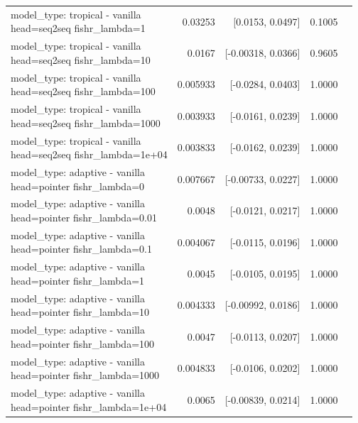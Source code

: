 \documentclass[10pt]{article}
\makeatletter
\newcommand{\stackcell}[1]{\begin{tabular}[t]{@{}l@{}}#1\end{tabular}}
\makeatother
\begin{document}
{\begin{longtable}{lrrrl}
\stackcell{model\_type: tropical - vanilla\\\footnotesize head=seq2seq fishr\_lambda=1 } & 0.03253 & [0.0153, 0.0497] & 0.1005 & \\
\stackcell{model\_type: tropical - vanilla\\\footnotesize head=seq2seq fishr\_lambda=10 } & 0.0167 & [-0.00318, 0.0366] & 0.9605 & \\
\stackcell{model\_type: tropical - vanilla\\\footnotesize head=seq2seq fishr\_lambda=100 } & 0.005933 & [-0.0284, 0.0403] & 1.0000 & \\
\stackcell{model\_type: tropical - vanilla\\\footnotesize head=seq2seq fishr\_lambda=1000 } & 0.003933 & [-0.0161, 0.0239] & 1.0000 & \\
\stackcell{model\_type: tropical - vanilla\\\footnotesize head=seq2seq fishr\_lambda=1e+04 } & 0.003833 & [-0.0162, 0.0239] & 1.0000 & \\
\stackcell{model\_type: adaptive - vanilla\\\footnotesize head=pointer fishr\_lambda=0 } & 0.007667 & [-0.00733, 0.0227] & 1.0000 & \\
\stackcell{model\_type: adaptive - vanilla\\\footnotesize head=pointer fishr\_lambda=0.01 } & 0.0048 & [-0.0121, 0.0217] & 1.0000 & \\
\stackcell{model\_type: adaptive - vanilla\\\footnotesize head=pointer fishr\_lambda=0.1 } & 0.004067 & [-0.0115, 0.0196] & 1.0000 & \\
\stackcell{model\_type: adaptive - vanilla\\\footnotesize head=pointer fishr\_lambda=1 } & 0.0045 & [-0.0105, 0.0195] & 1.0000 & \\
\stackcell{model\_type: adaptive - vanilla\\\footnotesize head=pointer fishr\_lambda=10 } & 0.004333 & [-0.00992, 0.0186] & 1.0000 & \\
\stackcell{model\_type: adaptive - vanilla\\\footnotesize head=pointer fishr\_lambda=100 } & 0.0047 & [-0.0113, 0.0207] & 1.0000 & \\
\stackcell{model\_type: adaptive - vanilla\\\footnotesize head=pointer fishr\_lambda=1000 } & 0.004833 & [-0.0106, 0.0202] & 1.0000 & \\
\stackcell{model\_type: adaptive - vanilla\\\footnotesize head=pointer fishr\_lambda=1e+04 } & 0.0065 & [-0.00839, 0.0214] & 1.0000 & \\

\end{longtable}}
\end{document}
